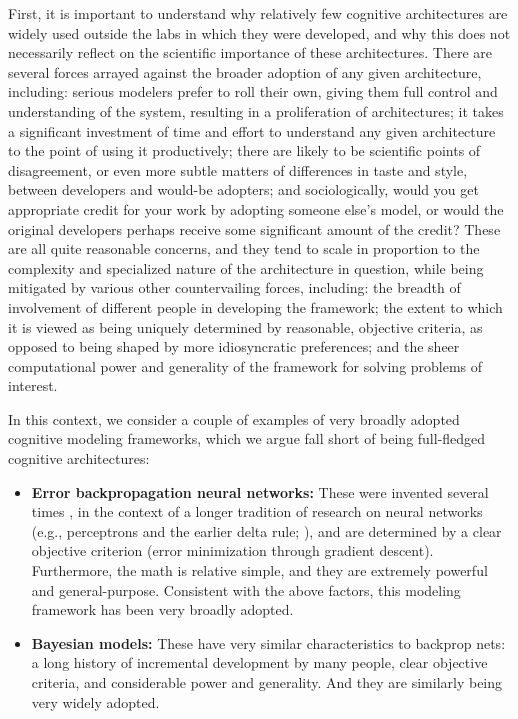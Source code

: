 \documentclass[11pt,twoside]{article}
\begin{document}
First, it is important to understand why relatively few cognitive architectures are widely used outside the labs in which they were developed, and why this does not necessarily reflect on the scientific importance of these architectures.  There are several forces arrayed against the broader adoption of any given architecture, including: serious modelers prefer to roll their own, giving them full control and understanding of the system, resulting in a proliferation of architectures; it takes a significant investment of time and effort to understand any given architecture to the point of using it productively; there are likely to be scientific points of disagreement, or even more subtle matters of differences in taste and style, between developers and would-be adopters; and sociologically, would you get appropriate credit for your work by adopting someone else's model, or would the original developers perhaps receive some significant amount of the credit?  These are all quite reasonable concerns, and they tend to scale in proportion to the complexity and specialized nature of the architecture in question, while being mitigated by various other countervailing forces, including: the breadth of involvement of different people in developing the framework; the extent to which it is viewed as being uniquely determined by reasonable, objective criteria, as opposed to being shaped by more idiosyncratic preferences; and the sheer computational power and generality of the framework for solving problems of interest.

In this context, we consider a couple of examples of very broadly adopted cognitive modeling frameworks, which we argue fall short of being full-fledged cognitive architectures:
\begin{itemize}
\item {\bf Error backpropagation neural networks:}  These were invented several times \cite{bprefs}, in the context of a longer tradition of research on neural networks (e.g., perceptrons and the earlier delta rule; ), and are determined by a clear objective criterion (error minimization through gradient descent).  Furthermore, the math is relative simple, and they are extremely powerful and general-purpose.  Consistent with the above factors, this modeling framework has been very broadly adopted. 
\item {\bf Bayesian models:} These have very similar characteristics to backprop nets: a long history of incremental development by many people, clear objective criteria, and considerable power and generality.  And they are similarly being very widely adopted.
\end{itemize}
\end{document}
